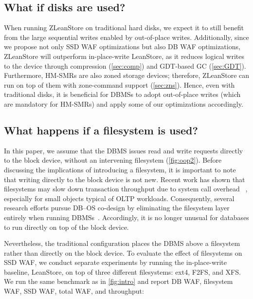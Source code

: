 \subsection{What if disks are used?}\label{sec:q3}
\noindent {}
When running ZLeanStore on traditional hard disks, we expect it to still benefit from the large sequential writes enabled by out-of-place writes.
Additionally, since we propose not only SSD WAF optimizations but also DB WAF optimizations,
ZLeanStore will outperform in-place-write LeanStore, as it reduces logical writes to the device through compression (\cref{sec:comp}) and GDT-based GC (\cref{sec:GDT}).
Furthermore, HM-SMRs are also zoned storage devices; therefore, ZLeanStore can run on top of them with zone-command support (\cref{sec:zns}).
Hence, even with traditional disks, it is beneficial for DBMSs to adopt out-of-place writes (which are mandatory for HM-SMRs) and apply some of our optimizations accordingly.

\subsection{What happens if a filesystem is used?}\label{sec:q4}
In this paper, we assume that the DBMS issues read and write requests directly to the block device, without an intervening filesystem (\cref{fig:oop2}).
Before discussing the implications of introducing a filesystem, it is important to note that writing directly to the block device is not new.
Recent work has shown that filesystems may slow down transaction throughput due to system call overhead
~\cite{DBLP:conf/icde/NguyenL24,DBLP:conf/icit/HinesCA23,DBLP:journals/corr/SearsIG07,DBLP:journals/pvldb/GaffneyPBHKP22, DBLP:journals/tos/AghayevWKNGA20},
especially for small objects typical of OLTP workloads.
Consequently, several research efforts pursue DB--OS co-design by eliminating the filesystem layer entirely when running DBMSs~\cite{DBLP:journals/pvldb/SkiadopoulosLKK21}. 
Accordingly, it is no longer unusual for databases to run directly on top of the block device.

Nevertheless, the traditional configuration places the DBMS above a filesystem rather than directly on the block device.
To evaluate the effect of filesystems on SSD WAF, we conduct separate experiments by running the in-place-write baseline, LeanStore, on top of three different filesystems: ext4, F2FS, and XFS.
We run the same benchmark as in \cref{fig:intro} and report DB WAF, filesystem WAF, SSD WAF, total WAF, and throughput:

